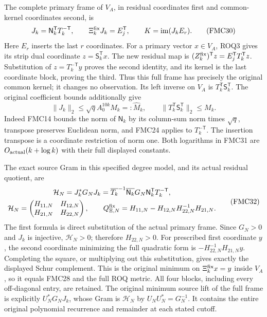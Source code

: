 \documentclass[11pt,a4paper]{article}
\begin{document}
The complete primary frame of $V_A$, in residual coordinates first
and common-kernel coordinates second, is
\[
 J_k=\mathsf N_k^{\mathsf T}T_k^{-\mathsf T},\qquad
 \Xi_k^{\rm fix}J_k=E_j^{\mathsf T},\qquad
 K=\operatorname{im}(J_kE_r).
 \tag{FMC30}
\]
Here $E_r$ inserts the last $r$ coordinates. For a primary vector
$x\in V_A$, ROQ3 gives its strip dual coordinate
$z=\mathsf S_k^{\mathsf T}x$. The new residual map is
$(Z_k^{\rm fix})^{\mathsf T}z=E_j^{\mathsf T}T_k^{\mathsf T}z$.
Substitution of $z=T_k^{-\mathsf T}y$ proves the second identity,
and its kernel is the last coordinate block, proving the third.
Thus this full frame has precisely the original common kernel;
it changes no observation. Its left inverse on $V_A$ is
$T_k^{\mathsf T}\mathsf S_k^{\mathsf T}$.
The original coefficient bounds additionally give
\[
 \|J_k\|_2\le\sqrt q A_0^{10k}M_k=:\widehat M_k,
 \qquad
 \|T_k^{\mathsf T}\mathsf S_k^{\mathsf T}\|_2\le M_k.
 \tag{FMC31}
\]
Indeed FMC14 bounds the norm of $\mathsf N_k$ by its column-sum
norm times $\sqrt q$, transpose preserves Euclidean norm, and
FMC24 applies to $T_k^{-\mathsf T}$. The insertion transpose is
a coordinate restriction of norm one. Both logarithms in FMC31
are $O_{\rm actual}(k+\log k)$ with their full displayed constants.

The exact source Gram in this specified degree model, and its actual
residual quotient, are
\[
 \begin{gathered}
 \mathcal H_N=J_k^*G_NJ_k
       =\overline{T_k}^{-1}
          \overline{\mathsf N_k}G_N\mathsf N_k^{\mathsf T}
                                               T_k^{-\mathsf T},\\
 \mathcal H_N=
       \begin{pmatrix}H_{11,N}&H_{12,N}\\H_{21,N}&H_{22,N}\end{pmatrix},
 \qquad
 Q_{\Xi,N}^{\rm fix}=H_{11,N}-H_{12,N}H_{22,N}^{-1}H_{21,N}.
 \end{gathered}\tag{FMC32}
\]
The first formula is direct substitution of the actual primary
frame. Since $G_N>0$ and $J_k$ is injective, $\mathcal H_N>0$;
therefore $H_{22,N}>0$. For prescribed first coordinate $y$, the
second coordinate minimizing the full quadratic form is
$-H_{22,N}^{-1}H_{21,N}y$. Completing the square, or multiplying
out this substitution, gives exactly the displayed Schur
complement. This is the original minimum on $\Xi_k^{\rm fix}x=y$
inside $V_A$, so it equals FMC28 and the full ROQ metric.
All four blocks, including every off-diagonal entry, are retained.
The original minimum source lift of the full frame is explicitly
$U_N^*G_NJ_k$, whose Gram is $\mathcal H_N$ by $U_NU_N^*=G_N^{-1}$.
It contains the entire original polynomial recurrence and remainder
at each stated cutoff.
\end{document}
